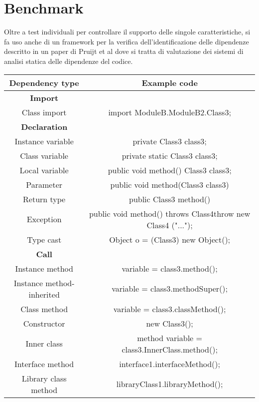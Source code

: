 \section{Benchmark}

Oltre a test individuali per controllare il supporto delle singole caratteristiche, si fa uso anche di un framework per la verifica dell'identificazione delle dipendenze descritto in un paper di Pruijt et al \cite{DBLP:journals/spe/PruijtKWB17} dove si tratta di valutazione dei sistemi di analisi statica delle dipendenze del codice.

\begin{center}
    \centering
    \begin{tabular}{|c c|}
        \hline
        Dependency type & Example code \\
        \hline
        \textbf{Import} &  \\
        Class import & import ModuleB.ModuleB2.Class3; \\
        \textbf{Declaration} &  \\
        Instance variable & private Class3 class3; \\
        Class variable & private static Class3 class3; \\
        Local variable & public void method() {Class3 class3; } \\
        Parameter & public void method(Class3 class3) {} \\
        Return type & public Class3 method() {} \\
        Exception & public void method() throws Class4{throw new Class4 ("..."); } \\
        Type cast & Object o = (Class3) new Object(); \\
        \textbf{Call} &  \\
        Instance method & variable = class3.method(); \\
        Instance method-inherited & variable = class3.methodSuper(); \\
        Class method & variable = class3.classMethod(); \\
        Constructor & new Class3(); \\
        Inner class & method variable = class3.InnerClass.method(); \\
        Interface method & interface1.interfaceMethod(); \\
        Library class method & libraryClass1.libraryMethod(); \\

\end{tabular}
\end{center}
